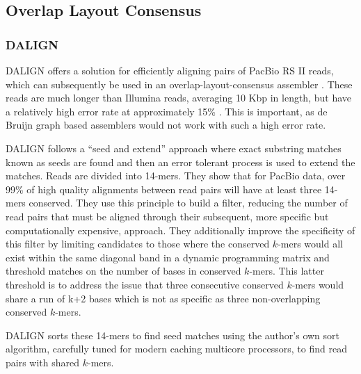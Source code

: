\documentclass[doctor]{thesis}
\begin{document}
\subsection{Overlap Layout Consensus}

\subsubsection{DALIGN}

DALIGN offers a solution for efficiently aligning pairs of PacBio RS II reads, which can subsequently be used in an overlap-layout-consensus assembler \cite{myers2014efficient}.
These reads are much longer than Illumina reads, averaging 10 Kbp in length, but have a relatively high error rate at approximately 15\%  \cite{quail2012tale,myers2014efficient}.  
This is important, as de Bruijn graph based assemblers would not work with such a high error rate.

DALIGN follows a ``seed and extend'' approach where exact substring matches known as seeds are found and then an error tolerant process is used to extend the matches.
Reads are divided into 14-mers.
They show that for PacBio data, over 99\% of high quality alignments between read pairs will have at least three 14-mers conserved.
They use this principle to build a filter, reducing the number of read pairs that must be aligned through their subsequent, more specific but computationally expensive, approach.
They additionally improve the specificity of this filter by limiting candidates to those where the conserved $k$-mers would all exist within the same diagonal band in a dynamic programming matrix and threshold matches on the number of bases in conserved $k$-mers. This latter threshold is to address the issue that three consecutive conserved $k$-mers would share a run of k+2 bases which is not as specific as three non-overlapping conserved $k$-mers.

DALIGN sorts these 14-mers to find seed matches using the author's own sort algorithm, carefully tuned for modern caching multicore processors, to find read pairs with shared $k$-mers.
\end{document}

